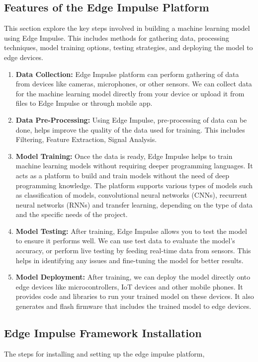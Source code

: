 \subsection{Features of the Edge Impulse Platform}
This section explore the key steps involved in building a machine learning model using Edge Impulse. This includes methods for gathering data, processing techniques, model training options, testing strategies, and deploying the model to edge devices.  \cite{edgeimpulse_docs:2024}
\begin{enumerate}
	\item \textbf{Data Collection:} Edge Impulse platform can perform gathering of data from devices like cameras, microphones, or other sensors. We can collect data for the machine learning model directly from your device or upload it from files to Edge Impulse or through mobile app.
	\item \textbf{Data Pre-Processing:} Using Edge Impulse, pre-processing of data can be done, helps improve the quality of the data used for training. This includes Filtering, Feature Extraction, Signal Analysis.
	\item \textbf{Model Training:} Once the data is ready, Edge Impulse helps to train machine learning models without requiring deeper programming languages. It acts as a platform to build and train models without the need of deep programming knowledge. The platform supports various types of models such as classification of models, convolutional neural networks (CNNs), recurrent neural networks (RNNs) and transfer learning, depending on the type of data and the specific needs of the project.
	\item \textbf{Model Testing:} After training, Edge Impulse allows you to test the model to ensure it performs well. We can use test data to evaluate the model's accuracy, or perform live testing by feeding real-time data from sensors. This helps in identifying any issues and fine-tuning the model for better results.
	\item \textbf{Model Deployment:} After training, we can deploy the model directly onto edge devices like microcontrollers, IoT devices and other mobile phones. It provides code and libraries to run your trained model on these devices. It also generates and flash firmware that includes the trained model to edge devices.
\end{enumerate}

\subsection{Edge Impulse Framework Installation}
The steps for installing and setting up the edge impulse platform, \cite{edgeimpulse_cli:2024}
	
